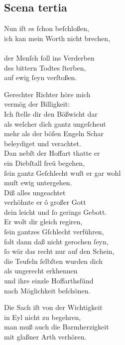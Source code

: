 \documentclass{ees}
\newenvironment{lyrics}[1]{%
  \subsection{#1}\nopagebreak%
  \begin{lyricslist}%
  \let\voice\item%
}{%
  \end{lyricslist}%
}
\begin{document}
\begin{lyrics}{Scena tertia}
  \voice[Schöpffer]
  Nun iſt es ſchon beſchloßen,\\
  ich kan mein Worth nicht brechen,\\\\
  der Menſch ſoll ins Verderben\\
  des bittern Todtes ſterben,\\
  auf ewig ſeyn verſtoßen.

  \voice[Gerecht.]
  Gerechter Richter höre mich\\
  vermög der Billigkeit:\\
  Ich ſtelle dir den Bößwicht dar\\
  als welcher dich gantz ungeſcheut\\
  mehr als der böſen Engeln Schar\\
  beleydiget und verachtet.\\
  Dan nebſt der Hoffart thatte er\\
  ein Diebſtall freü begehen,\\
  ſein gantz Geſchlecht wuſt er gar wohl\\
  muſt ewig untergehen.\\
  Diß alles ungeachtet\\
  verhöhnte er ô großer Gott\\
  dein leicht und ſo gerings Gebott.\\
  Er wolt dir gleich regiren,\\
  ſein gantzes Gſchlecht verführen,\\
  ſolt dann daß nicht gerochen ſeyn,\\
  ſo wär das recht nur auf den Schein,\\
  die Teufeln ſelbſten wurden dich\\
  als ungerecht erkhennen\\
  und ihre einzle Hoffarthsſünd\\
  nach Möglichkeit beſchönen.

  \voice[Schöpffer]
  Die Sach iſt von der Wichtigkeit\\
  in Eyl nicht zu begehren,\\
  man muß auch die Barmherzigkeit\\
  mit glaßner Arth verhören.


\end{lyrics}
\end{document}

